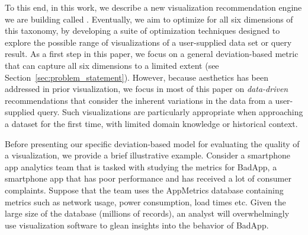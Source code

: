 To this end, in this work, we describe a new visualization recommendation engine we are building called {\it \SeeDB}.
Eventually, we aim to optimize for all six dimensions of this taxonomy, by developing a suite of optimization techniques designed to explore
the possible range of visualizations of a user-supplied data set or query result.  
As a first step in this paper, we focus on  a general deviation-based metric that can capture all six dimensions to a limited extent (see Section~\ref{sec:problem_statement}).  However, because aesthetics has been addressed in prior visualization, we focus in most of this paper on 
{\it data-driven} recommendations that consider the inherent variations in the data from a user-supplied query.  Such visualizations are particularly appropriate when
approaching a dataset for the first time, with limited domain knowledge or historical context.



Before presenting our specific deviation-based model for evaluating the quality of a visualization, we provide a brief illustrative example.
Consider a smartphone app analytics team that is tasked with studying the metrics for BadApp, a smartphone app that has
poor performance and has received a lot of consumer complaints. 
Suppose that the team uses the AppMetrics database containing metrics such as network usage, 
power consumption, load times etc.
Given the large size of the database (millions of records), an analyst will 
overwhelmingly use visualization software to glean insights into the behavior of BadApp.

